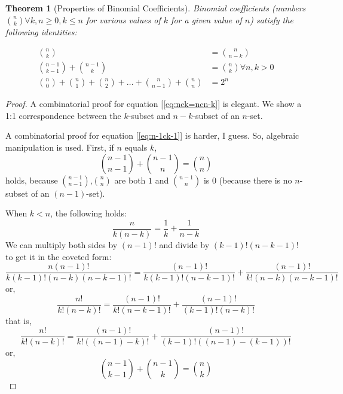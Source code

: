 \documentclass[11pt]{book}
\theoremstyle{definition}
\theoremstyle{plain}
\newtheorem{theorem}{Theorem}
\theoremstyle{definition}
\theoremstyle{problemstyle}
\theoremstyle{remark}
\theoremstyle{definition}
\begin{document}
\begin{theorem}[Properties of Binomial Coefficients]
    \label{th:binomial-coeffs-identities}
    Binomial coefficients (numbers $\binom{n}{k}\forall k,n\geq0, k\leq n$ for various values of $k$ for a given value of $n$) satisfy the following identities:

    \begin{align}
        \binom{n}{k}&=\binom{n}{n-k} \label{eq:nck=ncn-k}\\
        \binom{n-1}{k-1}+\binom{n-1}{k}&=\binom{n}{k} \forall n,k>0\label{eq:n-1ck-1}\\
        \binom{n}{0}+\binom{n}{1}+\binom{n}{2}+\dots+\binom{n}{n-1}+\binom{n}{n}&=2^n\label{eq:bin-coeffs-sum}
    \end{align}
\end{theorem}
\begin{proof}
    A combinatorial proof for equation [\ref{eq:nck=ncn-k}] is elegant. We show a 1:1 correspondence between the $k$-subset and $n-k$-subset of an $n$-set.

    A combinatorial proof for equation [\ref{eq:n-1ck-1}] is harder, I guess. So, algebraic manipulation is used. First, if $n$ equals $k$,
    \[
        \binom{n-1}{n-1}+\binom{n-1}{n}=\binom{n}{n}
    \]
    holds, because $\binom{n-1}{n-1}$,$\binom{n}{n}$ are both $1$ and $\binom{n-1}{n}$ is $0$ (because there is no $n$-subset of an $(n-1)$-set). 

    When $k<n$, the following holds:
    \[
        \frac{n}{k(n-k)}=\frac{1}{k}+\frac{1}{n-k}
    \]
    We can multiply both sides by $(n-1)!$ and divide by $(k-1)!(n-k-1)!$ to get it in the coveted form:
    \[
        \frac{n(n-1)!}{k(k-1)!(n-k)(n-k-1)!}=\frac{(n-1)!}{k(k-1)!(n-k-1)!}+\frac{(n-1)!}{k!(n-k)(n-k-1)!}
    \]
    or,
    \[
        \frac{n!}{k!(n-k)!}=\frac{(n-1)!}{k!(n-k-1)!}+\frac{(n-1)!}{(k-1)!(n-k)!}
    \]
    that is,
    \[
        \frac{n!}{k!(n-k)!}=\frac{(n-1)!}{k!((n-1)-k)!}+\frac{(n-1)!}{(k-1)!((n-1)-(k-1))!}
    \]
    or,
    \[
        \binom{n-1}{k-1}+\binom{n-1}{k}=\binom{n}{k}
    \]
\end{proof}
\end{document}
